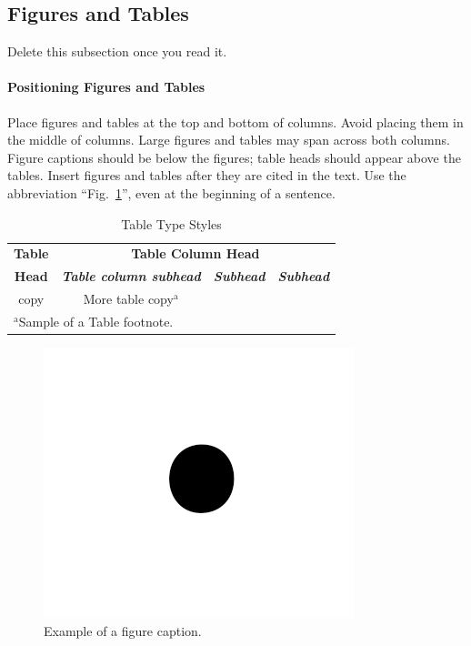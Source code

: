 \documentclass[conference]{IEEEtran}
\begin{document}
\subsection{Figures and Tables}
Delete this subsection once you read it.

\paragraph{Positioning Figures and Tables} Place figures and tables at the top and 
bottom of columns. Avoid placing them in the middle of columns. Large 
figures and tables may span across both columns. Figure captions should be 
below the figures; table heads should appear above the tables. Insert 
figures and tables after they are cited in the text. Use the abbreviation 
``Fig.~\ref{fig}'', even at the beginning of a sentence.

\begin{table}[htbp]
\caption{Table Type Styles}
\begin{center}
\begin{tabular}{|c|c|c|c|}
\hline
\textbf{Table}&\multicolumn{3}{|c|}{\textbf{Table Column Head}} \\
\cline{2-4} 
\textbf{Head} & \textbf{\textit{Table column subhead}}& \textbf{\textit{Subhead}}& \textbf{\textit{Subhead}} \\
\hline
copy& More table copy$^{\mathrm{a}}$& &  \\
\hline
\multicolumn{4}{l}{$^{\mathrm{a}}$Sample of a Table footnote.}
\end{tabular}
\label{tab1}
\end{center}
\end{table}

\begin{figure}[htbp]
\centerline{\includegraphics{fig1.png}}
\caption{Example of a figure caption.}
\label{fig}
\end{figure}
\end{document}
